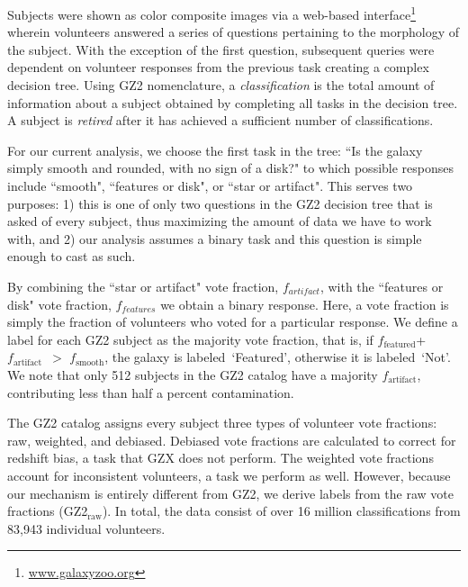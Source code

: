 \documentclass[twocolumn]{aastex6}
\newcommand{\feat}{`Featured'}
\newcommand{\notfeat}{`Not'}
\newcommand{\raw}{GZ2$_{\text{raw}}$}
\newcommand{\ffeat}{$f_{\mathrm{featured}}$}
\newcommand{\fsmooth}{$f_{\mathrm{smooth}}$}
\newcommand{\fstar}{$f_{\mathrm{artifact}}$}
\begin{document}
Subjects were shown as color composite images via a web-based interface\footnote{\url{www.galaxyzoo.org}} wherein 
volunteers answered a series of questions pertaining to the morphology of the subject.
With the exception of the first question, subsequent queries were 
dependent on volunteer responses from the previous task creating a complex decision tree. 
Using GZ2 nomenclature,  a \textit{classification} is the total amount of
information about a subject obtained by completing all tasks in the decision tree. 
A subject is \textit{retired} after it has achieved a sufficient number of classifications.


For our current analysis, we choose the first task in the tree: 
``Is the galaxy simply smooth and rounded, with no sign of a disk?" to which possible 
responses include ``smooth", ``features or disk", or ``star or artifact". 
This serves two purposes: 1) this is one of only two questions in the GZ2
decision tree that is asked of every subject, thus maximizing the amount of data
we have to work with, and 2) our analysis assumes a binary task and this question is 
simple enough to cast as such. 

By combining the ``star or artifact" vote fraction, $f_{artifact}$, 
with the ``features or disk" vote fraction, $f_{features}$ we obtain a binary response.
Here, a vote fraction is simply the fraction of volunteers who voted for a
particular response.  
We define a label for each GZ2 subject as the majority vote fraction, that is,
if \ffeat+\fstar~$ >$ \fsmooth, the galaxy is labeled~\feat, otherwise
it is labeled~\notfeat. 
We note that only 512 subjects in the GZ2 catalog have a majority \fstar, 
contributing less than half a percent contamination.

The GZ2 catalog assigns every subject three types of volunteer vote fractions: 
raw, weighted, and debiased. 
Debiased vote fractions are calculated to correct for redshift bias, a task that 
GZX does not perform. 
The weighted vote fractions account for inconsistent volunteers, 
a task we perform as well. However, because our mechanism is entirely different 
from GZ2, we derive labels from the raw vote fractions (\raw).
 In total, the data consist of over 16 million classifications from 83,943 individual volunteers. 

\end{document}
